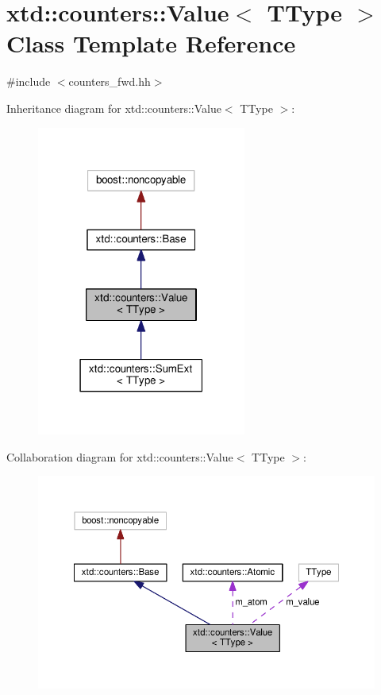 \hypertarget{classxtd_1_1counters_1_1Value}{}\section{xtd\+:\+:counters\+:\+:Value$<$ T\+Type $>$ Class Template Reference}
\label{classxtd_1_1counters_1_1Value}


{\ttfamily \#include $<$counters\+\_\+fwd.\+hh$>$}



Inheritance diagram for xtd\+:\+:counters\+:\+:Value$<$ T\+Type $>$\+:
\nopagebreak
\begin{figure}[H]
\begin{center}
\leavevmode
\includegraphics[width=195pt]{classxtd_1_1counters_1_1Value__inherit__graph}
\end{center}
\end{figure}


Collaboration diagram for xtd\+:\+:counters\+:\+:Value$<$ T\+Type $>$\+:
\nopagebreak
\begin{figure}[H]
\begin{center}
\leavevmode
\includegraphics[width=350pt]{classxtd_1_1counters_1_1Value__coll__graph}
\end{center}
\end{figure}
